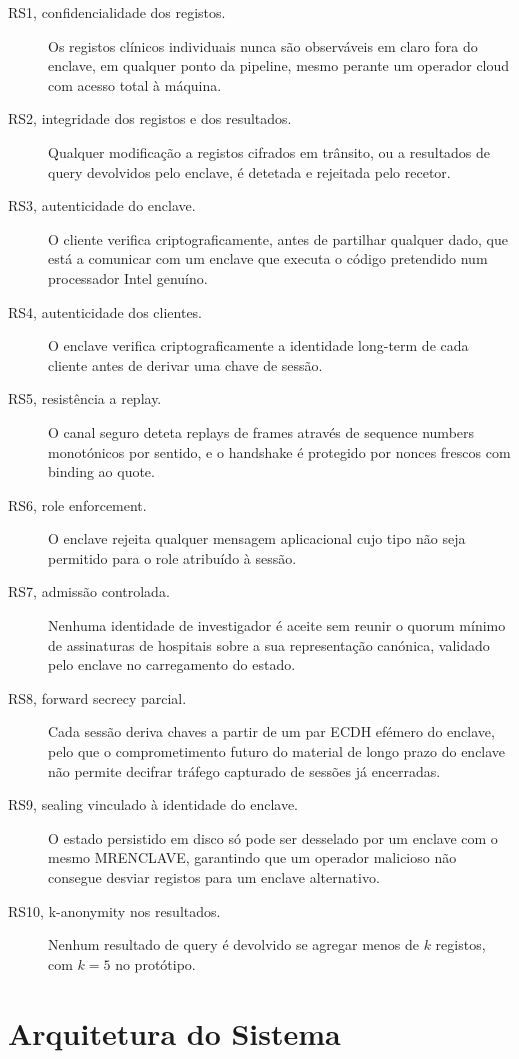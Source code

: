 \begin{description}
  \item[RS1, confidencialidade dos registos.] Os registos clínicos individuais nunca são observáveis em claro fora do enclave, em qualquer ponto da pipeline, mesmo perante um operador cloud com acesso total à máquina.
  \item[RS2, integridade dos registos e dos resultados.] Qualquer modificação a registos cifrados em trânsito, ou a resultados de query devolvidos pelo enclave, é detetada e rejeitada pelo recetor.
  \item[RS3, autenticidade do enclave.] O cliente verifica criptograficamente, antes de partilhar qualquer dado, que está a comunicar com um enclave que executa o código pretendido num processador Intel genuíno.
  \item[RS4, autenticidade dos clientes.] O enclave verifica criptograficamente a identidade long-term de cada cliente antes de derivar uma chave de sessão.
  \item[RS5, resistência a replay.] O canal seguro deteta replays de frames através de sequence numbers monotónicos por sentido, e o handshake é protegido por nonces frescos com binding ao quote.
  \item[RS6, role enforcement.] O enclave rejeita qualquer mensagem aplicacional cujo tipo não seja permitido para o role atribuído à sessão.
  \item[RS7, admissão controlada.] Nenhuma identidade de investigador é aceite sem reunir o quorum mínimo de assinaturas de hospitais sobre a sua representação canónica, validado pelo enclave no carregamento do estado.
  \item[RS8, forward secrecy parcial.] Cada sessão deriva chaves a partir de um par ECDH efémero do enclave, pelo que o comprometimento futuro do material de longo prazo do enclave não permite decifrar tráfego capturado de sessões já encerradas.
  \item[RS9, sealing vinculado à identidade do enclave.] O estado persistido em disco só pode ser desselado por um enclave com o mesmo MRENCLAVE, garantindo que um operador malicioso não consegue desviar registos para um enclave alternativo.
  \item[RS10, k-anonymity nos resultados.] Nenhum resultado de query é devolvido se agregar menos de $k$ registos, com $k=5$ no protótipo.
\end{description}

\section{Arquitetura do Sistema}

